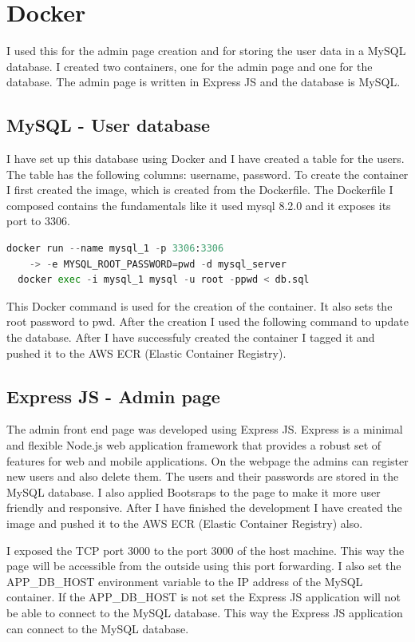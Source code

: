 \documentclass[11pt,a4paper,oneside]{report}
\begin{document}
\section{Docker}

I used this for the admin page creation and for storing the user data in a MySQL database. I created two containers, one for the admin page and one for the database. The admin page is written in Express JS and the database is MySQL.

\subsection{MySQL - User database}
I have set up this database using Docker and I have created a table for the users. The table has the following columns: username, password. To create the container I first created the image, which is created from the Dockerfile. The Dockerfile I composed contains the fundamentals like it used mysql 8.2.0 and it exposes its port to 3306.
\begin{lstlisting}[language=Python,basicstyle=\ttfamily\small,]
  docker run --name mysql_1 -p 3306:3306 
    -> -e MYSQL_ROOT_PASSWORD=pwd -d mysql_server
  docker exec -i mysql_1 mysql -u root -ppwd < db.sql
\end{lstlisting}
This Docker command is used for the creation of the container. It also sets the root password to pwd. After the creation I used the following command to update the database.
After I have successfuly created the container I tagged it and pushed it to the AWS ECR (Elastic Container Registry).

\subsection{Express JS - Admin page}

The admin front end page was developed using Express JS. Express is a minimal and flexible Node.js web application framework that provides a robust set of features for web and mobile applications.
On the webpage the admins can register new users and also delete them. The users and their passwords are stored in the MySQL database. I also applied Bootsraps to the page to make it more user friendly and responsive.
After I have finished the development I have created the image and pushed it to the AWS ECR (Elastic Container Registry) also.

I exposed the TCP port 3000 to the port 3000 of the host machine. This way the page will be accessible from the outside using this port forwarding.
I also set the APP\_DB\_HOST environment variable to the IP address of the MySQL container. If the APP\_DB\_HOST is not set the Express JS application will not be able to connect to the MySQL database.
This way the Express JS application can connect to the MySQL database.
\end{document}
